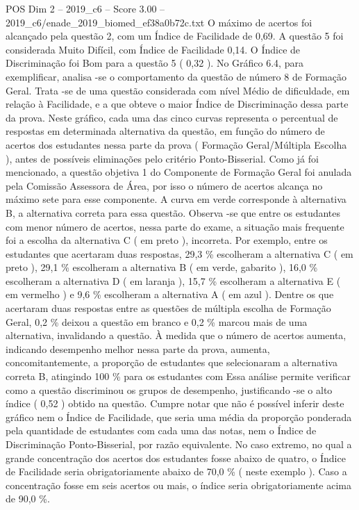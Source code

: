 \begin{textsample}{POS Dim 2 – 2019\_c6 – Score 3.00 – 2019\_c6/enade\_2019\_biomed\_ef38a0b72c.txt}
O máximo de acertos foi alcançado pela questão 2, com um Índice de Facilidade de 0,69.
A questão 5 foi considerada Muito Difícil, com Índice de Facilidade 0,14.
O Índice de Discriminação foi Bom para a questão 5 ( 0,32 ).
No Gráfico 6.4, para exemplificar, analisa -se o comportamento da questão de número 8 de Formação Geral.
Trata -se de uma questão considerada com nível Médio de dificuldade, em relação à Facilidade, e a que obteve o maior Índice de Discriminação dessa parte da prova.
Neste gráfico, cada uma das cinco curvas representa o percentual de respostas em determinada alternativa da questão, em função do número de acertos dos estudantes nessa parte da prova ( Formação Geral/Múltipla Escolha ), antes de possíveis eliminações pelo critério Ponto-Bisserial.
Como já foi mencionado, a questão objetiva 1 do Componente de Formação Geral foi anulada pela Comissão Assessora de Área, por isso o número de acertos alcança no máximo sete para esse componente.
A curva em verde corresponde à alternativa B, a alternativa correta para essa questão.
Observa -se que entre os estudantes com menor número de acertos, nessa parte do exame, a situação mais frequente foi a escolha da alternativa C ( em preto ), incorreta.
Por exemplo, entre os estudantes que acertaram duas respostas, 29,3 \% escolheram a alternativa C ( em preto ), 29,1 \% escolheram a alternativa B ( em verde, gabarito ), 16,0 \% escolheram a alternativa D ( em laranja ), 15,7 \% escolheram a alternativa E ( em vermelho ) e 9,6 \% escolheram a alternativa A ( em azul ).
Dentre os que acertaram duas respostas entre as questões de múltipla escolha de Formação Geral, 0,2 \% deixou a questão em branco e 0,2 \% marcou mais de uma alternativa, invalidando a questão.
À medida que o número de acertos aumenta, indicando desempenho melhor nessa parte da prova, aumenta, concomitantemente, a proporção de estudantes que selecionaram a alternativa correta B, atingindo 100 \% para os estudantes com Essa análise permite verificar como a questão discriminou os grupos de desempenho, justificando -se o alto índice ( 0,52 ) obtido na questão.
Cumpre notar que não é possível inferir deste gráfico nem o Índice de Facilidade, que seria uma média da proporção ponderada pela quantidade de estudantes com cada uma das notas, nem o Índice de Discriminação Ponto-Bisserial, por razão equivalente.
No caso extremo, no qual a grande concentração dos acertos dos estudantes fosse abaixo de quatro, o Índice de Facilidade seria obrigatoriamente abaixo de 70,0 \% ( neste exemplo ).
Caso a concentração fosse em seis acertos ou mais, o índice seria obrigatoriamente acima de 90,0 \%.

\end{textsample}
